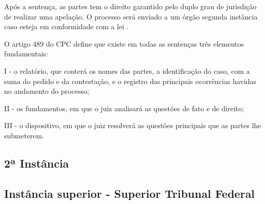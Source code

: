 Após a sentença, as partes tem o direito garantido pelo duplo grau de jurisdição de realizar uma apelação. O processo será enviado a um órgão segunda instância caso esteja em conformidade com a lei \cite{GONCALVES2016}.

O artigo 489 do CPC define que existe em todas as sentenças três elementos fundamentais:

\begin{citacao}
I - o relatório, que conterá os nomes das partes, a identificação do caso, com a suma do pedido e da contestação, e o registro das principais ocorrências havidas no andamento do processo;

II - os fundamentos, em que o juiz analisará as questões de fato e de direito;

III - o dispositivo, em que o juiz resolverá as questões principais que as partes lhe submeterem. \cite{BRASIL2015}
\end{citacao}

\subsection{2ª Instância}



\subsection{Instância superior - Superior Tribunal Federal}